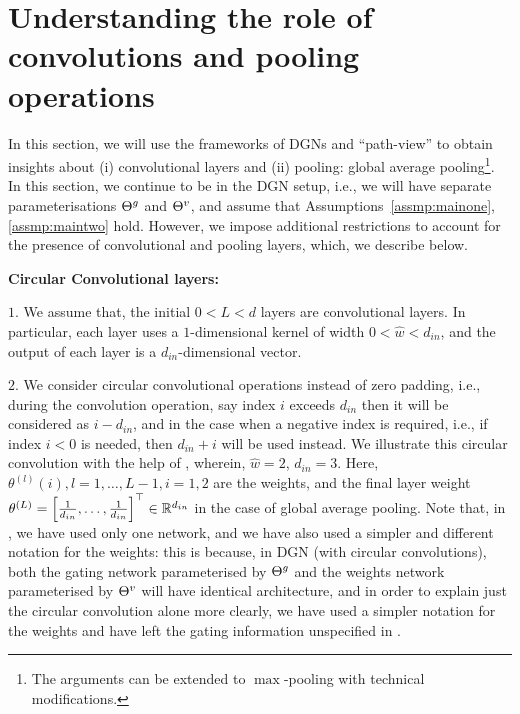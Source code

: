 \section{Understanding the role of convolutions and pooling operations}\label{sec:conv}
In this section, we will use the frameworks of DGNs and ``path-view'' to obtain insights about (i) convolutional layers and (ii) pooling: global average pooling\footnote{The arguments can be extended to $\max$-pooling with technical modifications.}. In this section, we continue to be in the DGN setup, i.e., we will have separate parameterisations ${\Theta}^g$ and ${\Theta}^v$, and assume that Assumptions~\ref{assmp:mainone}, \ref{assmp:maintwo} hold. However, we impose additional restrictions to account for the presence of convolutional and pooling layers, which, we describe below.

\textbf{Circular Convolutional layers:}

$1.$ We assume that, the initial $0<L<d$ layers are convolutional layers. In particular, each layer uses a $1$-dimensional kernel of width $0<\hat{w}<d_{in}$, and the output of each layer is a $d_{in}$-dimensional vector.

$2.$ We consider circular convolutional operations instead of zero padding, i.e., during the convolution operation, say index $i$ exceeds $d_{in}$ then it will be considered as $i-d_{in}$, and in the case when a negative index is required, i.e., if index $i<0$ is needed, then $d_{in}+i$ will be used instead. We illustrate this circular convolution with the help of , wherein, $\hat{w}=2$, $d_{in}=3$. Here, $\theta^{(l)}(i),l=1,\ldots,L-1, i=1,2$ are the weights, and the final layer weight $\theta^{(L)}=\left[\frac{1}{d_{in}},\ldots, \frac{1}{d_{in}}\right]^\top\in \mathbb{R}^{d_{in}}$ in the case of global average pooling. Note that, in , we have used only one network, and we have also used a simpler and different notation for the weights: this is because, in DGN (with circular convolutions), both the gating network parameterised by ${\Theta}^g$ and the weights network parameterised by ${\Theta}^v$ will have identical architecture, and in order to explain just the circular convolution alone more clearly, we have used a simpler notation for the weights and have left the gating information unspecified in .


